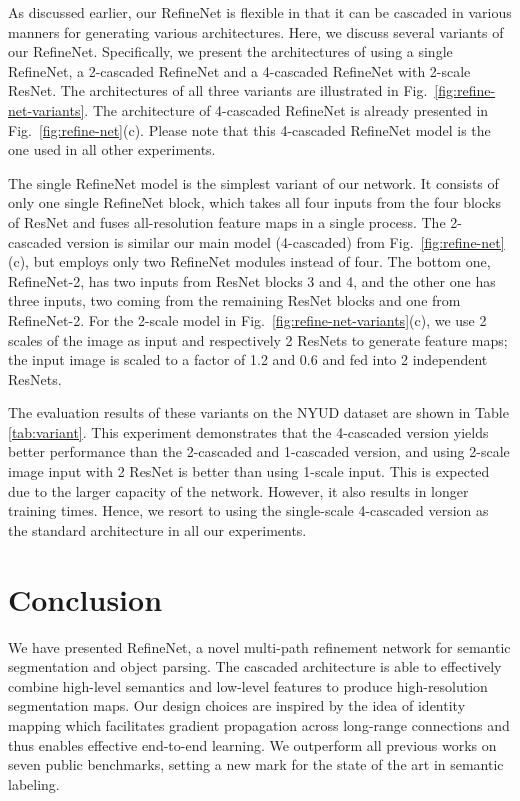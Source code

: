 \documentclass[10pt,twocolumn,letterpaper]{article}
\newcommand{\Fig}{Fig.\xspace}
\newcommand{\refOurFig}{\ref{fig:refine-net}(c)\xspace}
\begin{document}
As discussed earlier, our RefineNet is flexible in that it can be cascaded in various manners for generating various architectures.
Here, we discuss several variants of our RefineNet. Specifically, we present the architectures of using
a single RefineNet, a 2-cascaded RefineNet and a 4-cascaded RefineNet with 2-scale ResNet.
The architectures of all three variants are illustrated in Fig.~\ref{fig:refine-net-variants}.
The architecture of 4-cascaded RefineNet is already presented in \Fig~\refOurFig. 
Please note that this 4-cascaded RefineNet model is the one used in all other experiments.

The single RefineNet model is the simplest variant of our network. It consists of only one single RefineNet block, which takes all four inputs from the four blocks of ResNet and fuses all-resolution feature maps in a single process.  
The 2-cascaded version is similar our main model (4-cascaded) from \Fig~\refOurFig, but employs only two RefineNet modules instead of four. The bottom one, RefineNet-2, has two inputs from ResNet blocks 3 and 4, and the other one has three inputs, two coming from the remaining ResNet blocks and one from RefineNet-2.
For the 2-scale model in Fig.~\ref{fig:refine-net-variants}(c), we use 2 scales of the image as input and respectively 2 ResNets to generate feature maps;
the input image is scaled to a factor of 1.2 and 0.6 and fed into 2 independent ResNets. 


The evaluation results of these variants on the NYUD dataset are shown in Table \ref{tab:variant}. 
This experiment demonstrates that the 4-cascaded version yields better performance than the 2-cascaded and 1-cascaded version, and using 2-scale image input with 2 ResNet is better than using 1-scale input. This is expected due to the larger capacity of the network. However, it also results in longer training times. Hence, we resort to using the single-scale 4-cascaded version as the standard architecture in all our experiments.



 \section{Conclusion}
\label{sec:conclusion}

We have presented RefineNet, a novel multi-path refinement network  for semantic segmentation and object parsing. The cascaded architecture is able to effectively combine high-level semantics and low-level features to produce high-resolution segmentation maps. 
Our design choices are inspired by the idea of identity mapping which facilitates gradient propagation across long-range connections and thus enables effective end-to-end learning.
We outperform all previous works on seven public benchmarks, setting a new mark for the state of the art in semantic labeling. 
 
\end{document}

